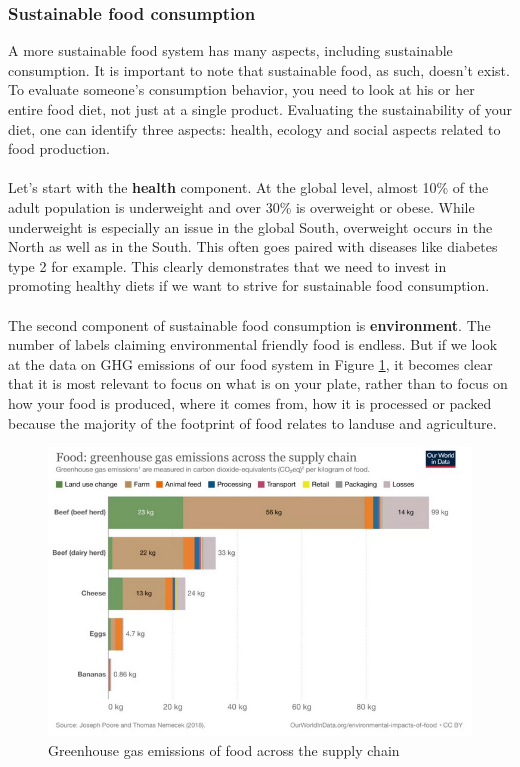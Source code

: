 \documentclass[../summary.tex]{subfiles}
\begin{document}
	\newpage
	\subsubsection{Sustainable food consumption}
	
	A more sustainable food system has many aspects, including sustainable consumption. It is important to note that sustainable food, as such, doesn’t exist. To evaluate someone’s consumption behavior, you need to look at his or her entire food diet, not just at a single product. Evaluating the sustainability of your diet, one can identify three aspects: health, ecology and social aspects related to food production.
	\\\\
	Let’s start with the \textbf{health} component. At the global level, almost 10\% of the adult population is underweight and over 30\% is overweight or obese. While underweight is especially an issue in the global South, overweight occurs in the North as well as in the South. This often goes paired with diseases like diabetes type 2 for example. This clearly demonstrates that we need to invest in promoting healthy diets if we want to strive for sustainable food consumption.
	\\\\
	The second component of sustainable food consumption is \textbf{environment}. The number of labels claiming environmental friendly food is endless. But if we look at the data on GHG emissions of our food system in Figure \ref{fig:greenhouse-gas}, it becomes clear that it is most relevant to focus on what is on your plate, rather than to focus on how your food is produced, where it comes from, how it is processed or packed because the majority of the footprint of food relates to landuse and agriculture. 
	
	\begin{figure} [htbp]
		\centering
		\includegraphics[width=1\linewidth]{images/6-greenhouse-gas.png}
		\caption{Greenhouse gas emissions of food across the supply chain}
		\label{fig:greenhouse-gas}
	\end{figure}
	
\end{document}
